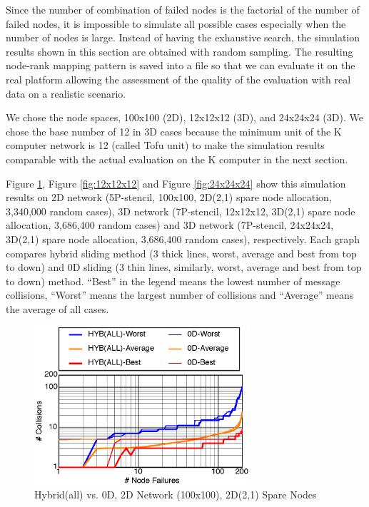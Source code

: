 \documentclass[Afour,times,sageh]{sagej}
\begin{document}
Since the number of combination of failed nodes is the factorial of
the number of failed nodes, it is impossible to simulate all possible
cases especially when the number of nodes is large. Instead of having
the exhaustive search, the simulation results shown in this section
are obtained with random sampling. The resulting node-rank mapping
pattern is saved into a file so that we can evaluate it on
the real platform allowing the assessment of the quality of the evaluation
with real data on a realistic scenario.

We chose the node spaces, 100x100 (2D), 12x12x12 (3D), and 24x24x24
(3D). We chose the base number of 12 in 3D cases  because the minimum
unit of the K computer network is 12 (called Tofu unit) to make the
simulation results comparable with the actual evaluation on the K
computer in the next section.

Figure \ref{fig:100x100}, Figure \ref{fig:12x12x12} and
Figure \ref{fig:24x24x24} show this simulation results on 2D network
(5P-stencil, 100x100, 2D(2,1) spare node allocation, 3,340,000 random
cases), 3D network (7P-stencil, 12x12x12, 3D(2,1) spare node
allocation, 3,686,400 random cases) and 3D network (7P-stencil,
24x24x24, 3D(2,1) spare node allocation, 3,686,400 random cases),
respectively. Each graph compares hybrid sliding method (3 thick
lines, worst, average and best from top to down) and 0D
sliding (3 thin lines, similarly, worst, average and best
from top to down) method. ``Best'' in the legend means the lowest
number of message collisions, ``Worst'' means the largest number of
collisions and ``Average'' means the average of all cases.

\begin{figure}[ht]
\centering
\includegraphics[width=80mm]{Figs/100x100-CL.eps}
  \caption{Hybrid(all) vs. 0D, 2D Network (100x100), 2D(2,1) Spare Nodes}
  \label{fig:100x100}
\end{figure}
\end{document}
